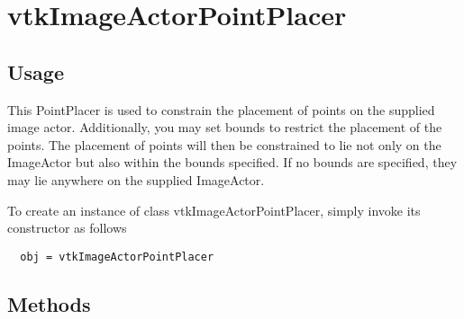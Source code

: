 \section{vtkImageActorPointPlacer}

\subsection{Usage}

 This PointPlacer is used to constrain the placement of points on the
 supplied image actor. Additionally, you may set bounds to restrict the 
 placement of the points. The placement of points will then be constrained 
 to lie not only on the ImageActor but also within the bounds specified. 
 If no bounds are specified, they may lie anywhere on the supplied ImageActor.

To create an instance of class vtkImageActorPointPlacer, simply
invoke its constructor as follows
\begin{verbatim}
  obj = vtkImageActorPointPlacer
\end{verbatim}
\subsection{Methods}

